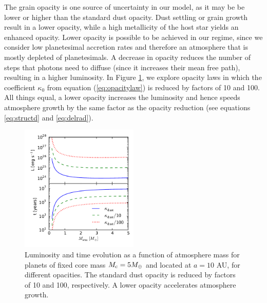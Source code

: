 \documentclass[apj]{emulateapj}
\begin{document}
The grain opacity is one source of uncertainty in our model, as it may be be lower or higher than the standard dust opacity. Dust settling or grain growth result in a lower opacity, while a high metallicity of the host star yields an enhanced opacity. Lower opacity is possible to be achieved in our regime, since we consider low planetesimal accretion rates and therefore an atmosphere that is mostly depleted of planetesimals.  A decrease in opacity reduces the number of steps that photons need to diffuse (since it increases their mean free path), resulting in a higher luminosity. In Figure \ref{fig:LtvsMopacity}, we explore opacity laws in which the coefficient $\kappa_0$ from equation (\ref{eq:opacitylaw}) is reduced by factors of 10 and 100. All things equal, a lower opacity increases the luminosity and hence speeds atmosphere growth by the same factor as the opacity reduction (see equations \ref{eq:structd} and \ref{eq:delrad}). 
 

 \begin{figure}[h]
\centering
\includegraphics[width=0.5\textwidth]{../../figs/ModelAtmospheres/RadSelfGravPoly/PaperFigs/opacity_effect.pdf}
\caption{Luminosity and time evolution as a function of atmosphere mass for planets of fixed core mass $M_{\rm c}=5 M_{\oplus}$ and located at $a=10$ AU, for different opacities. The standard dust opacity is reduced by factors of 10 and 100, respectively. A lower opacity accelerates atmosphere growth.}
\label{fig:LtvsMopacity}
\end{figure}



\end{document}
